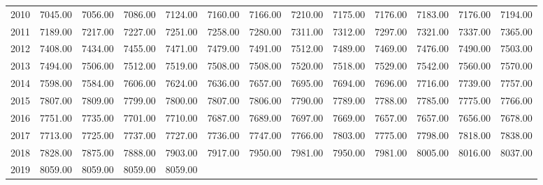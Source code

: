 \begin{longtable}{rrrrrrrrrrrrr}
  2010 & 7045.00 & 7056.00 & 7086.00 & 7124.00 & 7160.00 & 7166.00 & 7210.00 & 7175.00 & 7176.00 & 7183.00 & 7176.00 & 7194.00 \\ 
  2011 & 7189.00 & 7217.00 & 7227.00 & 7251.00 & 7258.00 & 7280.00 & 7311.00 & 7312.00 & 7297.00 & 7321.00 & 7337.00 & 7365.00 \\ 
  2012 & 7408.00 & 7434.00 & 7455.00 & 7471.00 & 7479.00 & 7491.00 & 7512.00 & 7489.00 & 7469.00 & 7476.00 & 7490.00 & 7503.00 \\ 
  2013 & 7494.00 & 7506.00 & 7512.00 & 7519.00 & 7508.00 & 7508.00 & 7520.00 & 7518.00 & 7529.00 & 7542.00 & 7560.00 & 7570.00 \\ 
  2014 & 7598.00 & 7584.00 & 7606.00 & 7624.00 & 7636.00 & 7657.00 & 7695.00 & 7694.00 & 7696.00 & 7716.00 & 7739.00 & 7757.00 \\ 
  2015 & 7807.00 & 7809.00 & 7799.00 & 7800.00 & 7807.00 & 7806.00 & 7790.00 & 7789.00 & 7788.00 & 7785.00 & 7775.00 & 7766.00 \\ 
  2016 & 7751.00 & 7735.00 & 7701.00 & 7710.00 & 7687.00 & 7689.00 & 7697.00 & 7669.00 & 7657.00 & 7657.00 & 7656.00 & 7678.00 \\ 
  2017 & 7713.00 & 7725.00 & 7737.00 & 7727.00 & 7736.00 & 7747.00 & 7766.00 & 7803.00 & 7775.00 & 7798.00 & 7818.00 & 7838.00 \\ 
  2018 & 7828.00 & 7875.00 & 7888.00 & 7903.00 & 7917.00 & 7950.00 & 7981.00 & 7950.00 & 7981.00 & 8005.00 & 8016.00 & 8037.00 \\ 
  2019 & 8059.00 & 8059.00 & 8059.00 & 8059.00 &  &  &  &  &  &  &  &  \\ 
   \hline
\hline
\end{longtable}
